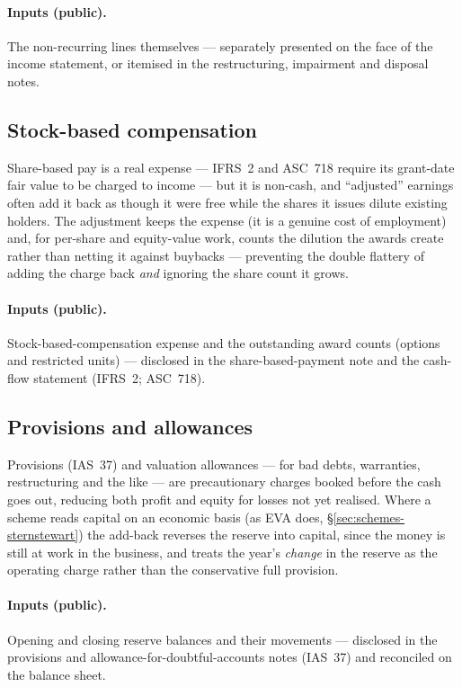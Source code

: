 \documentclass[11pt,a4paper]{report}
\begin{document}
\paragraph{Inputs (public).} The non-recurring lines themselves --- separately presented on the face of the
income statement, or itemised in the restructuring, impairment and disposal notes.

\subsection{Stock-based compensation}
\label{sec:topics-sbc}
Share-based pay is a real expense --- IFRS~2 and ASC~718 require its grant-date fair value to be charged to
income --- but it is non-cash, and ``adjusted'' earnings often add it back as though it were free while the
shares it issues dilute existing holders. The adjustment keeps the expense (it is a genuine cost of employment)
and, for per-share and equity-value work, counts the dilution the awards create rather than netting it against
buybacks --- preventing the double flattery of adding the charge back \emph{and} ignoring the share count it
grows.

\paragraph{Inputs (public).} Stock-based-compensation expense and the outstanding award counts (options and
restricted units) --- disclosed in the share-based-payment note and the cash-flow statement (IFRS~2; ASC~718).

\subsection{Provisions and allowances}
\label{sec:topics-provisions}
Provisions (IAS~37) and valuation allowances --- for bad debts, warranties, restructuring and the like --- are
precautionary charges booked before the cash goes out, reducing both profit and equity for losses not yet
realised. Where a scheme reads capital on an economic basis (as EVA does, \S\ref{sec:schemes-sternstewart}) the
add-back reverses the reserve into capital, since the money is still at work in the business, and treats the
year's \emph{change} in the reserve as the operating charge rather than the conservative full provision.

\paragraph{Inputs (public).} Opening and closing reserve balances and their movements --- disclosed in the
provisions and allowance-for-doubtful-accounts notes (IAS~37) and reconciled on the balance sheet.
\end{document}
